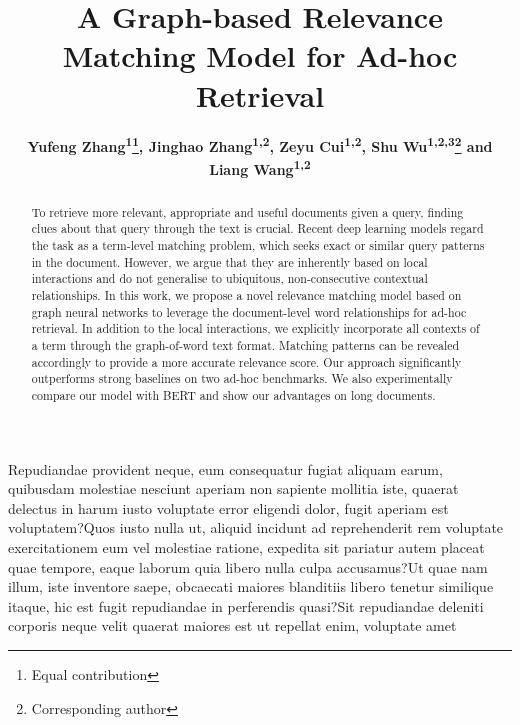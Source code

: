 \documentclass[letterpaper]{article} %
\title{A Graph-based Relevance Matching Model for Ad-hoc Retrieval}
\author{\textbf{Yufeng Zhang\textsuperscript{\rm 1}\thanks{Equal contribution}, Jinghao Zhang\textsuperscript{\rm 1,\rm 2}\footnotemark[1], Zeyu Cui\textsuperscript{\rm 1,\rm 2}, Shu Wu\textsuperscript{\rm 1,\rm2,\rm 3}\thanks{Corresponding author} and Liang Wang\textsuperscript{\rm 1,\rm 2}} \\
}
\begin{document}
\maketitle

\begin{abstract}
To retrieve more relevant, appropriate and useful documents given a query, finding clues about that query through the text is crucial. Recent deep learning models regard the task as a term-level matching problem, which seeks exact or similar query patterns in the document. However, we argue that they are inherently based on local interactions and do not generalise to ubiquitous, non-consecutive contextual relationships. In this work, we propose a novel relevance matching model based on graph neural networks to leverage the document-level word relationships for ad-hoc retrieval. In addition to the local interactions, we explicitly incorporate all contexts of a term through the graph-of-word text format. Matching patterns can be revealed accordingly to provide a more accurate relevance score. Our approach significantly outperforms strong baselines on two ad-hoc benchmarks. We also experimentally compare our model with BERT and show our advantages on long documents.



\end{abstract}













Repudiandae provident neque, eum consequatur fugiat aliquam earum, quibusdam molestiae nesciunt aperiam non sapiente mollitia iste, quaerat delectus in harum iusto voluptate error eligendi dolor, fugit aperiam est voluptatem?Quos iusto nulla ut, aliquid incidunt ad reprehenderit rem voluptate exercitationem eum vel molestiae ratione, expedita sit pariatur autem placeat quae tempore, eaque laborum quia libero nulla culpa accusamus?Ut quae nam illum, iste inventore saepe, obcaecati maiores blanditiis libero tenetur similique itaque, hic est fugit repudiandae in perferendis quasi?Sit repudiandae deleniti corporis neque velit quaerat maiores est ut repellat enim, voluptate amet

\end{document}
